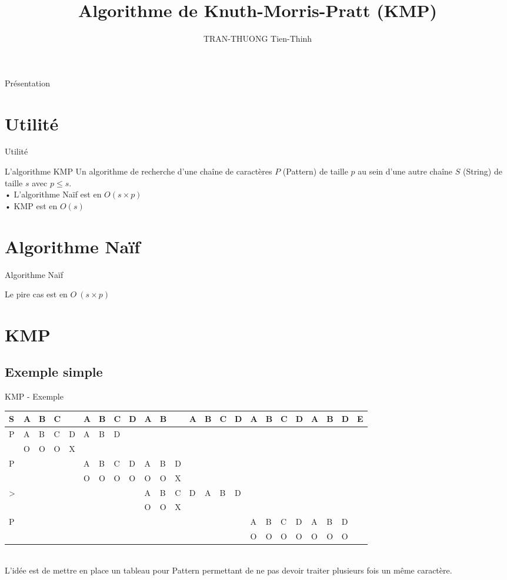 \documentclass[12pt]{beamer}
\author{TRAN-THUONG Tien-Thinh}
\title{Algorithme de Knuth-Morris-Pratt (KMP)}
\begin{document}
\begin{frame}
\titlepage
\end{frame}

\begin{frame}{Présentation}
\tableofcontents
\end{frame}

\section{Utilité}
\begin{frame}{Utilité}
\begin{block}{L'algorithme KMP}
Un algorithme de recherche d'une chaîne de caractères $P$ (Pattern) de taille $p$ au sein d'une autre chaîne $S$ (String) de taille $s$ avec $p \leq s$. \\
• L'algorithme Naïf est en $O(s \times p) $ \\
• KMP est en $O(s) $
\end{block}
\end{frame}

\section{Algorithme Naïf}
\begin{frame}{Algorithme Naïf}

Le pire cas est en $O\ (s \times p)$
\end{frame}

\section{KMP}
\subsection{Exemple simple}
\begin{frame}{KMP - Exemple}
\begin{tabular}{ l || p{0.01cm}p{0.01cm}p{0.01cm}p{0.01cm}p{0.01cm}p{0.01cm}p{0.01cm}p{0.01cm}p{0.01cm}p{0.01cm}p{0.01cm}p{0.01cm}p{0.01cm}p{0.01cm}p{0.01cm}p{0.01cm}p{0.01cm}p{0.01cm}p{0.01cm}p{0.01cm}p{0.01cm}p{0.01cm}p{0.01cm}} 
   S  &A&B&C& &A&B&C&D&A&B& &A&B&C&D&A&B&C&D&A&B&D&E \\ \hline
   P  &A&B&C&D&A&B&D  \\ 
      &O&O&O&X \\ \hline
   P  & & & & &A&B&C&D&A&B&D \\
   	  & & & & &O&O&O&O&O&O&X \\
   >  & & & & & & & & &A&B&C&D&A&B&D \\
   	  & & & & & & & & &O&O&X \\ \hline
   P  & & & & & & & & & & & & & & & &A&B&C&D&A&B&D \\
      & & & & & & & & & & & & & & & &O&O&O&O&O&O&O  
\end{tabular} \\
L'idée est de mettre en place un tableau pour Pattern permettant de ne pas devoir traiter plusieurs fois un même caractère.
\end{frame}
\end{document}
